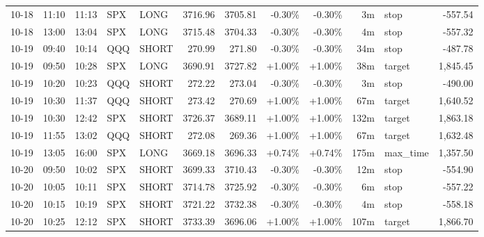 \documentclass[11pt,a4paper,twoside]{article}
\begin{document}
\begin{center}
\begin{longtable}{>{\color{txtmain}}l l l l l r r r r r >{\color{txtmain}}l r}
10-18 & 11:10 & 11:13 & SPX & LONG & 3716.96 & 3705.81 & \textcolor{lossred}{-0.30\%} & \textcolor{lossred}{-0.30\%} & 3m & stop & \textcolor{lossred}{-557.54} \\
10-18 & 13:00 & 13:04 & SPX & LONG & 3715.48 & 3704.33 & \textcolor{lossred}{-0.30\%} & \textcolor{lossred}{-0.30\%} & 4m & stop & \textcolor{lossred}{-557.32} \\
10-19 & 09:40 & 10:14 & QQQ & SHORT & 270.99 & 271.80 & \textcolor{lossred}{-0.30\%} & \textcolor{lossred}{-0.30\%} & 34m & stop & \textcolor{lossred}{-487.78} \\
10-19 & 09:50 & 10:28 & SPX & LONG & 3690.91 & 3727.82 & \textcolor{wingreen}{+1.00\%} & \textcolor{wingreen}{+1.00\%} & 38m & target & \textcolor{wingreen}{1,845.45} \\
10-19 & 10:20 & 10:23 & QQQ & SHORT & 272.22 & 273.04 & \textcolor{lossred}{-0.30\%} & \textcolor{lossred}{-0.30\%} & 3m & stop & \textcolor{lossred}{-490.00} \\
10-19 & 10:30 & 11:37 & QQQ & SHORT & 273.42 & 270.69 & \textcolor{wingreen}{+1.00\%} & \textcolor{wingreen}{+1.00\%} & 67m & target & \textcolor{wingreen}{1,640.52} \\
10-19 & 10:30 & 12:42 & SPX & SHORT & 3726.37 & 3689.11 & \textcolor{wingreen}{+1.00\%} & \textcolor{wingreen}{+1.00\%} & 132m & target & \textcolor{wingreen}{1,863.18} \\
10-19 & 11:55 & 13:02 & QQQ & SHORT & 272.08 & 269.36 & \textcolor{wingreen}{+1.00\%} & \textcolor{wingreen}{+1.00\%} & 67m & target & \textcolor{wingreen}{1,632.48} \\
10-19 & 13:05 & 16:00 & SPX & LONG & 3669.18 & 3696.33 & \textcolor{wingreen}{+0.74\%} & \textcolor{wingreen}{+0.74\%} & 175m & max\_time & \textcolor{wingreen}{1,357.50} \\
10-20 & 09:50 & 10:02 & SPX & SHORT & 3699.33 & 3710.43 & \textcolor{lossred}{-0.30\%} & \textcolor{lossred}{-0.30\%} & 12m & stop & \textcolor{lossred}{-554.90} \\
10-20 & 10:05 & 10:11 & SPX & SHORT & 3714.78 & 3725.92 & \textcolor{lossred}{-0.30\%} & \textcolor{lossred}{-0.30\%} & 6m & stop & \textcolor{lossred}{-557.22} \\
10-20 & 10:15 & 10:19 & SPX & SHORT & 3721.22 & 3732.38 & \textcolor{lossred}{-0.30\%} & \textcolor{lossred}{-0.30\%} & 4m & stop & \textcolor{lossred}{-558.18} \\
10-20 & 10:25 & 12:12 & SPX & SHORT & 3733.39 & 3696.06 & \textcolor{wingreen}{+1.00\%} & \textcolor{wingreen}{+1.00\%} & 107m & target & \textcolor{wingreen}{1,866.70} \\

\end{longtable}
\end{center}
\end{document}
